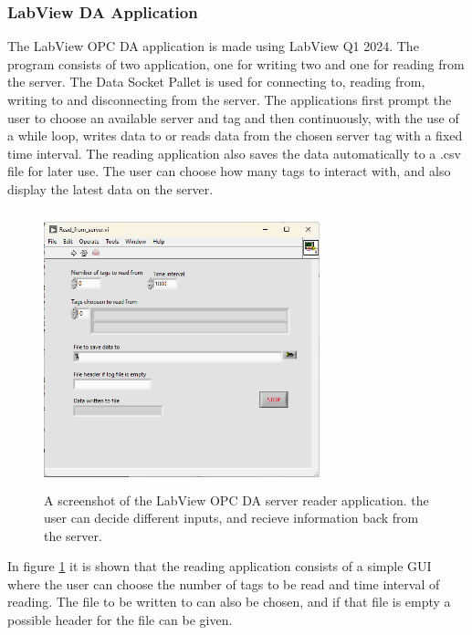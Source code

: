 \documentclass[11pt, A4paper, english]{article}
\begin{document}
			\subsubsection{LabView DA Application}
The LabView OPC DA application is made using LabView Q1 2024. The program consists of two application, one for writing two and one for reading from the server. The Data Socket Pallet is used for connecting to, reading from, writing to and disconnecting from the server. The applications first prompt the user to choose an available server and tag and then continuously, with the use of a while loop, writes data to or reads data from the chosen server tag with a fixed time interval. The reading application also saves the data automatically to a .csv file for later use. The user can choose how many tags to interact with, and also display the latest data on the server. \\
				\begin{figure}
\includegraphics[width=8cm, height=8cm]{Labview OPC DA/builds/Read from server/Read_Screenshot.png}
\caption{A screenshot of the LabView OPC DA server reader application. the user can decide different inputs, and recieve information back from the server.}
\label{im:L_DA_R}
				\end{figure}
In figure \ref{im:L_DA_R} it is shown that the reading application consists of a simple GUI where the user can choose the number of tags to be read and time interval of reading. The file to be written to can also be chosen, and if that file is empty a possible header for the file can be given. \\
\end{document}

